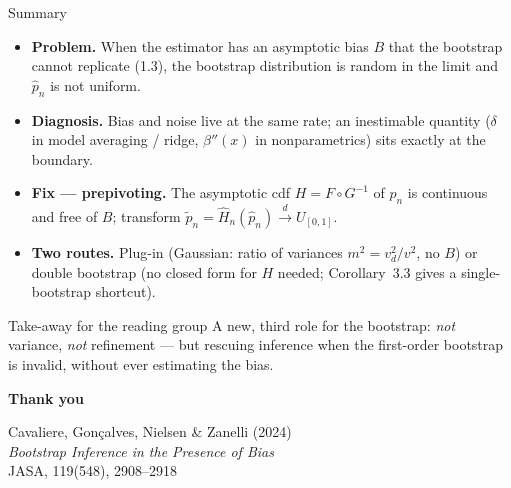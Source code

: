 \documentclass[10pt,aspectratio=169]{beamer}
\theoremstyle{plain}
\newcommand{\dto}{\xrightarrow{d}}
\newcommand{\pnh}{\hat{p}_{n}}
\newcommand{\pnt}{\tilde{p}_{n}}
\newcommand{\Hnh}{\hat{H}_{n}}
\begin{document}
\begin{frame}{Summary}

  \begin{itemize}
    \setlength{\itemsep}{8pt}
    \item \textbf{Problem.} When the estimator has an asymptotic bias $B$ that the
      bootstrap cannot replicate (1.3), the bootstrap distribution is
      \alert{random in the limit} and $\pnh$ is not uniform.
    \item \textbf{Diagnosis.} Bias and noise live at the same rate; an inestimable
      quantity ($\delta$ in model averaging / ridge, $\beta''(x)$ in nonparametrics)
      sits exactly at the boundary.
    \item \textbf{Fix --- prepivoting.} The asymptotic cdf $H = F\circ G^{-1}$ of $\pnh$
      is continuous and \alert{free of $B$}; transform $\pnt = \Hnh(\pnh) \dto U_{[0,1]}$.
    \item \textbf{Two routes.} Plug-in (Gaussian: ratio of variances $m^2 = v_d^2/v^2$,
      no $B$) or double bootstrap (no closed form for $H$ needed; Corollary~3.3
      gives a single-bootstrap shortcut).
  \end{itemize}

  \medskip

  \begin{block}{Take-away for the reading group}
    A new, third role for the bootstrap: \textit{not} variance, \textit{not} refinement
    --- but \alert{rescuing inference} when the first-order bootstrap is invalid,
    without ever estimating the bias.
  \end{block}

\end{frame}


{
\begin{frame}[plain,c]
  \centering
  {\Large\bfseries Thank you}

  \bigskip

  \bigskip\bigskip

  \footnotesize\color{accentmuted}
  Cavaliere, Gon\c{c}alves, Nielsen \& Zanelli (2024)\\
  \textit{Bootstrap Inference in the Presence of Bias}\\
  JASA, 119(548), 2908--2918
\end{frame}
}

\appendix
\end{document}
